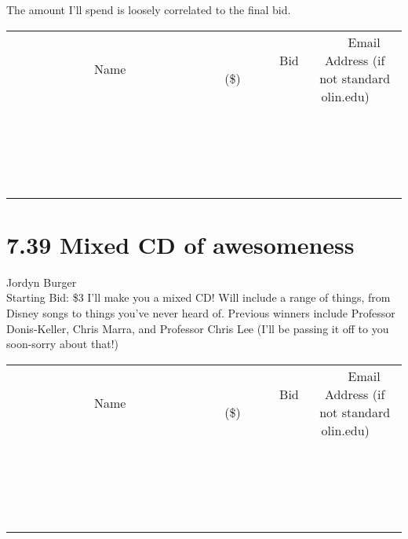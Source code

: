 \documentclass[11pt]{article}
\begin{document}
The amount I'll spend is loosely correlated to the final bid.
\\[3ex]
\begin{tabular}{c c c}
~~~~~~~~~~~~~Name~~~~~~~~~~~~~ & ~~~~~~~~~Bid (\$)~~~~~~~~~  & ~~~Email Address (if not standard olin.edu)~~~\\
 & & \\
\hline
 & & \\
\hline
 & & \\
\hline
 & & \\
\hline
 & & \\
\hline
 & & \\
\hline
 & & \\
\hline
 & & \\
\hline
 & & \\
\hline
 & & \\
\hline
 & & \\
\hline
 & & \\
\hline
 & & \\
\hline
 & & \\
\hline
 & & \\
\hline
 & & \\
\hline
 & & \\
\hline
 & & \\
\hline
 & & \\
\hline
\end{tabular}
\newpage
\section*{7.39 Mixed CD of awesomeness}
Jordyn Burger
\\
Starting Bid: \$3
\newline
I'll make you a mixed CD! Will include a range of things, from Disney songs to things you've never heard of. Previous winners include Professor Donis-Keller, Chris Marra, and Professor Chris Lee (I'll be passing it off to you soon-sorry about that!)
\\[3ex]
\begin{tabular}{c c c}
~~~~~~~~~~~~~Name~~~~~~~~~~~~~ & ~~~~~~~~~Bid (\$)~~~~~~~~~  & ~~~Email Address (if not standard olin.edu)~~~\\
 & & \\
\hline
 & & \\
\hline
 & & \\
\hline
 & & \\
\hline
 & & \\
\hline
 & & \\
\hline
 & & \\
\hline
 & & \\
\hline
 & & \\
\hline
 & & \\
\hline
 & & \\
\hline
 & & \\
\hline
 & & \\
\hline
 & & \\
\hline
 & & \\
\hline
 & & \\
\hline
 & & \\
\hline
 & & \\
\hline
 & & \\
\hline
\end{tabular}
\newpage
\end{document}
